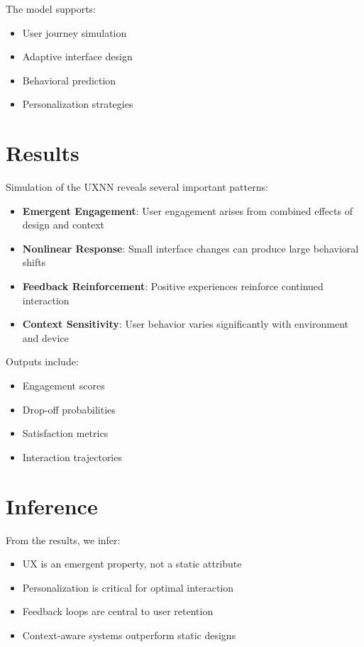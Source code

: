 \documentclass[12pt]{article}
\begin{document}
The model supports:

\begin{itemize}
\item User journey simulation
\item Adaptive interface design
\item Behavioral prediction
\item Personalization strategies
\end{itemize}

\section{Results}

Simulation of the UXNN reveals several important patterns:

\begin{itemize}
\item \textbf{Emergent Engagement}: User engagement arises from combined effects of design and context
\item \textbf{Nonlinear Response}: Small interface changes can produce large behavioral shifts
\item \textbf{Feedback Reinforcement}: Positive experiences reinforce continued interaction
\item \textbf{Context Sensitivity}: User behavior varies significantly with environment and device
\end{itemize}

Outputs include:

\begin{itemize}
\item Engagement scores
\item Drop-off probabilities
\item Satisfaction metrics
\item Interaction trajectories
\end{itemize}

\section{Inference}

From the results, we infer:

\begin{itemize}
\item UX is an emergent property, not a static attribute
\item Personalization is critical for optimal interaction
\item Feedback loops are central to user retention
\item Context-aware systems outperform static designs
\end{itemize}
\end{document}
